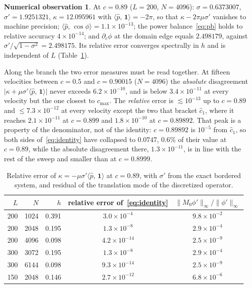 \documentclass[11pt]{article}
\theoremstyle{plain}
\theoremstyle{definition}
\newtheorem{observation}[theorem]{Numerical observation}
\theoremstyle{remark}
\newcommand{\ip}[2]{\langle #1,\,#2\rangle}
\newcommand{\ph}{\hat p}
\newcommand{\one}{\mathbf 1}
\newcommand{\chat}{\hat c_1}
\newcommand{\cmax}{c_{\max}}
\begin{document}
\begin{observation}\label{obs:identity}
At $c=0.89$ ($L=200$, $N=4096$): $\sigma=0.6373007$, $\sigma'=1.9251321$,
$\kappa=12.095961$ with $\ip{\ph}{\one}=-2\pi$, so that
$\kappa-2\pi\mu\sigma'$ vanishes to machine precision; $\ip{\ph}{\cos\phi}=1.1\times10^{-13}$;
the power balance~\eqref{eq:pb} holds to relative accuracy $4\times10^{-14}$; and
$\partial_c\phi$ at the domain edge equals $2.498179$, against
$\sigma'/\sqrt{1-\sigma^2}=2.498175$. Its relative error converges spectrally in $h$ and is
independent of $L$ (Table~\ref{tab:conv}).

Along the branch the two error measures must be read together. At fifteen velocities
between $c=0.5$ and $c=0.90015$ ($N=4096$) the \emph{absolute} disagreement
$\bigl|\kappa+\mu\sigma'\ip{\ph}{\one}\bigr|$ never exceeds $6.2\times10^{-10}$, and is below
$3.4\times10^{-11}$ at every velocity but the one closest to $\cmax$. The \emph{relative}
error is $\lesssim10^{-13}$ up to $c=0.89$ and $\leq7.3\times10^{-12}$ at every velocity
except the two that bracket $\chat$, where it reaches $2.1\times10^{-11}$ at $c=0.899$ and
$1.8\times10^{-10}$ at $c=0.89892$. That peak is a property of the denominator, not of the
identity: $c=0.89892$ is $10^{-5}$ from $\chat$, so both sides of~\eqref{eq:identity} have
collapsed to $0.0747$, $0.6\%$ of their value at $c=0.89$, while the absolute disagreement
there, $1.3\times10^{-11}$, is in line with the rest of the sweep and smaller than at
$c=0.8999$.
\end{observation}

\begin{table}[h]
\centering\small
\caption{Relative error of $\kappa=-\mu\sigma'\ip{\ph}{\one}$ at $c=0.89$, with $\sigma'$
from the exact bordered system, and residual of the translation mode of the discretized
operator.}
\label{tab:conv}
\begin{tabular}{@{}rrrcc@{}}
\toprule
$L$ & $N$ & $h$ & relative error of~\eqref{eq:identity} & $\|M_0\phi'\|_\infty/\|\phi'\|_\infty$\\
\midrule
200 & 1024 & 0.391 & $3.0\times10^{-4}$ & $9.8\times10^{-2}$\\
200 & 2048 & 0.195 & $1.3\times10^{-8}$ & $2.9\times10^{-4}$\\
200 & 4096 & 0.098 & $4.2\times10^{-14}$ & $2.5\times10^{-9}$\\
300 & 3072 & 0.195 & $1.3\times10^{-8}$ & $2.9\times10^{-4}$\\
300 & 6144 & 0.098 & $9.3\times10^{-14}$ & $2.5\times10^{-9}$\\
150 & 2048 & 0.146 & $2.7\times10^{-12}$ & $6.8\times10^{-6}$\\
\bottomrule
\end{tabular}
\end{table}
\end{document}
